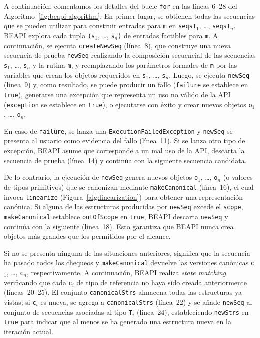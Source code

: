 A continuación, comentamos los detalles del bucle \texttt{for} en las líneas 6--28 del Algoritmo~\ref{fig:beapi-algorithm}. 
En primer lugar, se obtienen todas las secuencias que se pueden utilizar para construir entradas para \texttt{m} en \texttt{seqsT$_1$}, \ldots, \texttt{seqsT$_n$}. 
\textsf{BEAPI} explora cada tupla \texttt{(s$_1$}, \ldots, \texttt{s$_n$)} de entradas factibles para \texttt{m}.  
A continuación, se ejecuta \texttt{createNewSeq} (línea~8), que construye una nueva secuencia de prueba \texttt{newSeq} realizando la composición secuencial de las secuencias \texttt{s$_1$}, \ldots, \texttt{s$_n$} y la rutina \texttt{m}, 
y reemplazando los parámetros formales de \texttt{m} por las variables que crean los objetos requeridos en \texttt{s$_1$}, \ldots, \texttt{s$_n$}.  
Luego, se ejecuta \texttt{newSeq} (línea~9) y, como resultado, se puede producir un fallo (\texttt{failure} se establece en \texttt{true}), generarse una excepción que representa un uso no válido de la API (\texttt{exception} se establece en \texttt{true}), o ejecutarse con éxito y crear nuevos objetos \texttt{o$_1$}, \ldots, \texttt{o$_n$}.  

En caso de \texttt{failure}, se lanza una \texttt{ExecutionFailedException} y \texttt{newSeq} se presenta al usuario como evidencia del fallo (línea~11).  
Si se lanza otro tipo de excepción, \textsf{BEAPI} asume que corresponde a un mal uso de la API, descarta la secuencia de prueba (línea~14) y continúa con la siguiente secuencia candidata.  

De lo contrario, la ejecución de \texttt{newSeq} genera nuevos objetos \texttt{o$_1$}, \ldots, \texttt{o$_n$} (o valores de tipos primitivos) que se canonizan mediante \texttt{makeCanonical} (línea~16), el cual invoca \texttt{linearize} (Figura~\ref{alg:linearization}) para obtener una representación canónica.  
Si alguna de las estructuras producidas por \texttt{newSeq} excede el \texttt{scope}, \texttt{makeCanonical} establece \texttt{outOfScope} en \texttt{true}, \textsf{BEAPI} descarta \texttt{newSeq} y continúa con la siguiente (línea~18).  
Esto garantiza que \textsf{BEAPI} nunca crea objetos más grandes que los permitidos por el alcance.  

Si no se presenta ninguna de las situaciones anteriores, significa que la secuencia ha pasado todos los chequeos y \texttt{makeCanonical} devuelve las versiones canónicas \texttt{c$_1$}, \ldots, \texttt{c$_n$}, respectivamente.  
A continuación, \textsf{BEAPI} realiza \textit{state matching} verificando que cada \texttt{c$_i$} de tipo de referencia no haya sido creada anteriormente (líneas~20--25).  
El conjunto \texttt{canonicalStrs} almacena todas las estructuras ya vistas; si \texttt{c$_i$} es nueva, se agrega a \texttt{canonicalStrs} (línea~22) y se añade \texttt{newSeq} al conjunto de secuencias asociadas al tipo \texttt{T$_i$} (línea~24), estableciendo \texttt{newStrs} en \texttt{true} para indicar que al menos se ha generado una estructura nueva en la iteración actual.  

